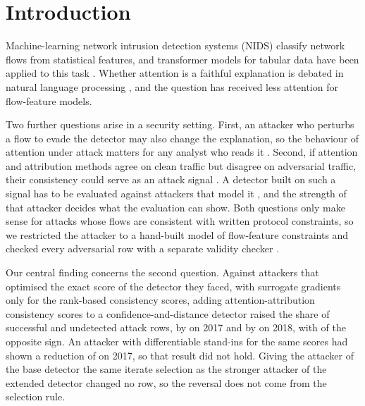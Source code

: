 \section{Introduction}
\label{sec:intro}

Machine-learning network intrusion detection systems (NIDS) classify network flows from statistical features, and transformer models for tabular data have
been applied to this task \cite{gorishniy2021,manocchio2024}.
Whether attention is a faithful explanation is debated in natural language processing
\cite{jain2019,wiegreffe2019,serrano2019}, and the question has received less attention for flow-feature models.

Two further questions arise in a security setting.
First, an attacker who perturbs a flow to evade the detector may also change the explanation, so the behaviour of
attention under attack matters for any analyst who reads it \cite{ghorbani2019,dombrowski2019,pruthi2020}.
Second, if attention and attribution methods agree on clean traffic but disagree on adversarial traffic, their
consistency could serve as an attack signal \cite{fidel2020}.
A detector built on such a signal has to be evaluated against attackers that model it \cite{tramer2020,carlini2017},
and the strength of that attacker decides what the evaluation can show.
Both questions only make sense for attacks whose flows are consistent with written protocol constraints, so we
restricted the attacker to a hand-built model of flow-feature constraints and checked every adversarial row with a
separate validity checker \cite{pierazzi2020,alhussien2024}.

Our central finding concerns the second question.
Against attackers that optimised the exact score of the detector they faced, with surrogate gradients only for the
\nRankScores{} rank-based consistency scores, adding attention-attribution consistency scores to a
confidence-and-distance detector raised the share of successful and undetected attack rows, by \axHeadVoneSeventeenAbs{}
on 2017 and by \axHeadVoneEighteenAbs{} on 2018, with \axHeadOppSeedsPhrase{} of the opposite sign.
An attacker with differentiable stand-ins for the same scores had shown a reduction of \axStandinVoneSeventeenAbs{} on
2017, so that result did not hold.
Giving the attacker of the base detector the same iterate selection as the stronger attacker of the extended detector
changed no row, so the reversal does not come from the selection rule.

